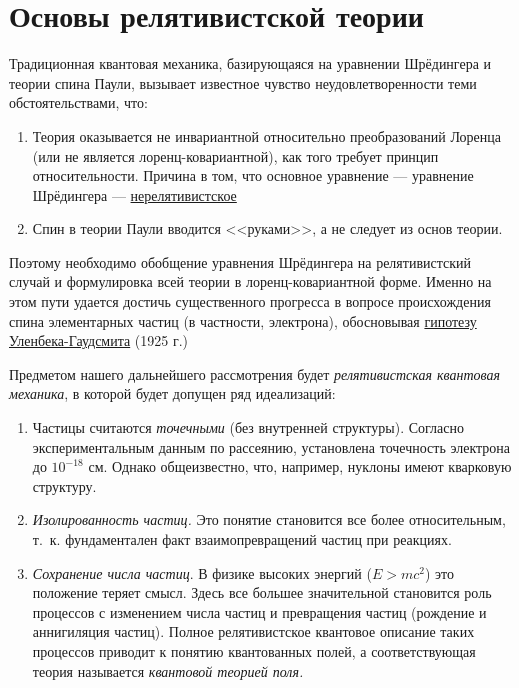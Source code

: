 \chapter{Основы релятивистской теории}

Традиционная квантовая механика, базирующаяся на уравнении Шрёдингера и теории спина Паули, вызывает известное чувство неудовлетворенности теми обстоятельствами, что:

\begin{sloppypar}
\begin{enumerate}
\item{Теория оказывается не инвариантной относительно преобразований Лоренца (или не является лоренц-ковариантной), как того требует принцип относительности. Причина в том, что основное уравнение --- уравнение Шрёдингера --- \underline{нерелятивистское}}
\item{Спин в теории Паули вводится <<руками>>, а не следует из основ теории.}
\end{enumerate}
\end{sloppypar}

Поэтому необходимо обобщение уравнения Шрёдингера на релятивистский случай и формулировка всей теории в лоренц-ковариантной форме. Именно на этом пути удается достичь существенного прогресса в вопросе происхождения спина элементарных частиц (в частности, электрона), обосновывая \underline{гипотезу Уленбека-Гаудсмита} (1925 г.)

Предметом нашего дальнейшего рассмотрения будет {\em релятивистская квантовая механика}, в которой будет допущен ряд идеализаций:
\begin{enumerate}
\item{Частицы считаются {\em точечными} (без внутренней структуры). Согласно экспериментальным данным по рассеянию, установлена точечность электрона до $10^{-18}$ см. Однако общеизвестно, что, например, нуклоны имеют кварковую структуру.}

\item{{\em Изолированность частиц.} Это понятие становится все более относительным, т.~к. фундаментален факт взаимопревращений частиц при реакциях.}
\item{{\em Сохранение числа частиц}. В физике высоких энергий (${E > mc^2}$) это положение теряет смысл. Здесь все большее значительной становится роль процессов с изменением числа частиц и превращения частиц (рождение и аннигиляция частиц). Полное релятивистское квантовое описание таких процессов приводит к понятию квантованных полей, а соответствующая теория называется {\em квантовой теорией поля.}}
\end{enumerate}

